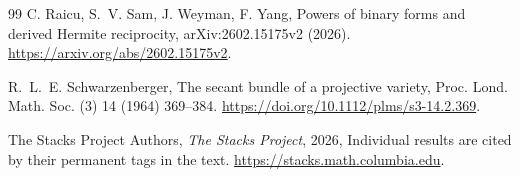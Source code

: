 \documentclass[10pt,fleqn]{article}
\numberwithin{equation}{section}
\begin{document}
\begin{thebibliography}{99}
C. Raicu, S.~V. Sam, J. Weyman, F. Yang,
Powers of binary forms and derived Hermite reciprocity,
arXiv:2602.15175v2 (2026).
\newblock \url{https://arxiv.org/abs/2602.15175v2}.

R.~L.~E. Schwarzenberger,
The secant bundle of a projective variety,
Proc. Lond. Math. Soc. (3) 14 (1964) 369--384.
\newblock \url{https://doi.org/10.1112/plms/s3-14.2.369}.

The Stacks Project Authors,
\emph{The Stacks Project}, 2026,
Individual results are cited by their permanent tags in the text.
\newblock \url{https://stacks.math.columbia.edu}.

\end{thebibliography}
\end{document}

